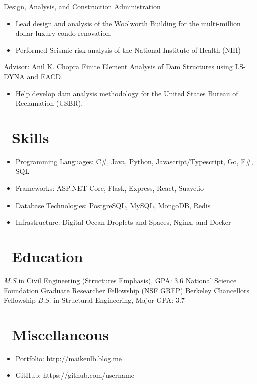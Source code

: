 \documentclass{resume}
\begin{document}
Design, Analysis, and Construction Administration
\begin{itemize}
  \item Lead design and analysis of the Woolworth Building for the
          multi-million dollar luxury condo renovation. 
  \item Performed Seismic risk analysis of the National Institute of Health (NIH)
\end{itemize}

 {Advisor: Anil K. Chopra}
Finite Element Analysis of Dam Structures using LS-DYNA and EACD.
\begin{itemize}
  \item Help develop dam analysis methodology for the United States Bureau of
          Reclamation (USBR).
\end{itemize}


\section{\faCogs\ Skills}
\begin{itemize}[parsep=0.5ex]
  \item Programming Languages: C\#, Java, Python, Javascript/Typescript, Go, F\#, SQL
  \item Frameworks: ASP.NET Core, Flask, Express, React, Suave.io
  \item Database Technologies: PostgreSQL, MySQL, MongoDB, Redis
  \item Infrastructure: Digital Ocean Droplets and Spaces, Nginx, and Docker
\end{itemize}

\section{\faGraduationCap\ Education}
\textit{M.S } in Civil Engineering (Structures Emphasis), GPA: 3.6
National Science Foundation Graduate Researcher Fellowship (NSF GRFP)
Berkeley Chancellors Fellowship
\textit{B.S.} in Structural Engineering, Major GPA: 3.7

\section{\faInfo\ Miscellaneous}
\begin{itemize}[parsep=0.5ex]
  \item Portfolio: http://maikeulb.blog.me
  \item GitHub: https://github.com/username
\end{itemize}

%
%
\end{document}
